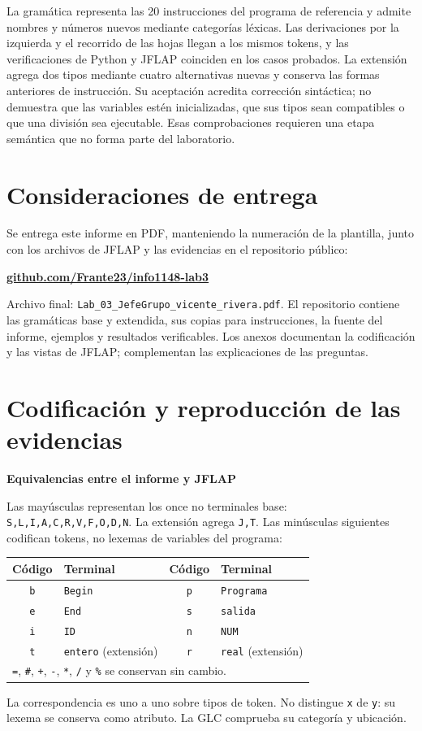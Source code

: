 \documentclass[11pt,letterpaper]{article}
\newcommand{\cod}[1]{\texttt{#1}}
\newcommand{\subtitulo}[1]{\vspace{5pt}\textbf{#1}\par\nopagebreak[4]}
\newcommand{\cab}[1]{\rowcolor{cabecera}#1}
\newcommand{\repo}{https://github.com/Frante23/info1148-lab3}
\begin{document}
La gramática representa las 20 instrucciones del programa de referencia y admite nombres y números nuevos mediante categorías léxicas. Las derivaciones por la izquierda y el recorrido de las hojas llegan a los mismos tokens, y las verificaciones de Python y JFLAP coinciden en los casos probados. La extensión agrega dos tipos mediante cuatro alternativas nuevas y conserva las formas anteriores de instrucción. Su aceptación acredita corrección sintáctica; no demuestra que las variables estén inicializadas, que sus tipos sean compatibles o que una división sea ejecutable. Esas comprobaciones requieren una etapa semántica que no forma parte del laboratorio.

\section{Consideraciones de entrega}
Se entrega este informe en PDF, manteniendo la numeración de la plantilla, junto con los archivos de JFLAP y las evidencias en el repositorio público:
\begin{center}\href{\repo}{\textbf{github.com/Frante23/info1148-lab3}}\end{center}
Archivo final: \cod{Lab\_03\_JefeGrupo\_vicente\_rivera.pdf}. El repositorio contiene las gramáticas base y extendida, sus copias para instrucciones, la fuente del informe, ejemplos y resultados verificables. Los anexos documentan la codificación y las vistas de JFLAP; complementan las explicaciones de las preguntas.

\clearpage\appendix
\section{Codificación y reproducción de las evidencias}
\subtitulo{Equivalencias entre el informe y JFLAP}
Las mayúsculas representan los once no terminales base: \cod{S,L,I,A,C,R,V,F,O,D,N}. La extensión agrega \cod{J,T}. Las minúsculas siguientes codifican tokens, no lexemas de variables del programa:
\begin{center}
\begin{tabular}{|c|l|c|l|}\hline
\cab{\textbf{Código}&\textbf{Terminal}&\textbf{Código}&\textbf{Terminal}}\\\hline
\cod{b}&\cod{Begin}&\cod{p}&\cod{Programa}\\\hline
\cod{e}&\cod{End}&\cod{s}&\cod{salida}\\\hline
\cod{i}&\cod{ID}&\cod{n}&\cod{NUM}\\\hline
\cod{t}&\cod{entero} (extensión)&\cod{r}&\cod{real} (extensión)\\\hline
\multicolumn{4}{|l|}{\cod{=}, \cod{\#}, \cod{+}, \cod{-}, \cod{*}, \cod{/} y \cod{\%} se conservan sin cambio.}\\\hline
\end{tabular}\end{center}
La correspondencia es uno a uno sobre tipos de token. No distingue \cod{x} de \cod{y}: su lexema se conserva como atributo. La GLC comprueba su categoría y ubicación.
\end{document}
